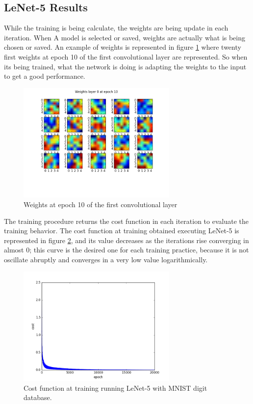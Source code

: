 \subsection{LeNet-5 Results}
While the training is being calculate, the weights are being update in each iteration. When A  model is selected or saved, weights are actually what is being chosen or saved. An example of weights is represented in figure \ref{fig:weights_lenet} where twenty first weights at epoch 10 of the first convolutional layer are represented. So when its being trained, what the network is doing is adapting the weights to the input to get a good performance.\\

\begin{figure}[htb]
\centering
\includegraphics[width=0.7\textwidth]{images/images_lenet/w_layer0_epoch10.png}
\caption{Weights at epoch 10 of the first convolutional layer} \label{fig:weights_lenet}
\end{figure}

The training procedure returns the cost function in each iteration to evaluate the training behavior. The cost function at training obtained executing LeNet-5 is represented in figure \ref{fig:Lenetcost}, and its value decreases as the iterations rise converging in almost 0; this curve is the desired one for each training practice, because it is not oscillate abruptly and converges in a very low value logarithmically.\\

\begin{figure}[htb]
\centering
\includegraphics[width=0.7\textwidth]{images/images_lenet/cost_lenet.png}
\caption{Cost function at training running LeNet-5 with MNIST digit database.} \label{fig:Lenetcost}
\end{figure}

